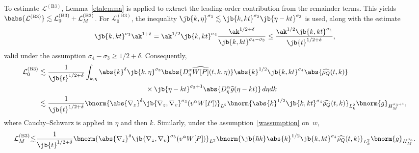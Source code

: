 To estimate $\mathcal{L}^{\mathrm{(B3)}}$, Lemma~\ref{etalemma} is applied to extract the leading-order contribution from the remainder terms. This yields $\babs{\mathcal{L}^{\mathrm{(B3)}}}\lesssim\mathcal{L}_0^{\mathrm{(B3)}} + \mathcal{L}_M^{\mathrm{(B3)}}$. For $\mathcal{L}_0^{\mathrm{(B3)}}$, the inequality $\jb{k,\eta}^{\sigma_3}\lesssim\jb{k,kt}^{\sigma_3}\jb{\eta-kt}^{\sigma_3}$ is used, along with the estimate
\begin{align*}
\jb{k,kt}^{\sigma_3}\ak^{1+\delta}=\ak^{1/2}\jb{k,kt}^{\sigma_4}\frac{\ak^{1/2+\delta}}{\jb{k,kt}^{\sigma_4-\sigma_3}}\leq \frac{\ak^{1/2}\jb{k,kt}^{\sigma_4}}{\jb{t}^{1/2+\delta}} ,
\end{align*}valid under the assumption $\sigma_4-\sigma_3\geq1/2+\delta$. Consequently,
\begin{align*}
\mathcal{L}_0^{\mathrm{(B3)}}&\lesssim\frac{1}{\jb{t}^{1/2+\delta}}\int_{k,\eta}\abs{k}^\delta\jb{k,\eta}^{\sigma_3} \babs{D_\eta^\alpha \widehat{W[P]}(t,k,\eta)}\abs{k}^{1/2}\jb{k,kt}^{\sigma_4} \abs{\widehat{\rho_Q}(t,k)}\\
&\hspace{5.5cm}\times\jb{\eta-kt}^{\sigma_3+1}\abs{D^\alpha_\eta\widehat g(\eta-kt)}\,d\eta dk\\
&\lesssim\frac{1}{\jb{t}^{1/2+\delta}}\bnorm{\abs{\nabla_z}^\delta\jb{\nabla_z,\nabla_v}^{\sigma_3}(v^\alpha W[P])}_{L^2}\bnorm{\abs{k}^{1/2}\jb{k,kt}^{\sigma_4} \widehat{\rho_Q}(t,k)}_{L^2_k}\bnorm{g}_{H^{\sigma_3+1}_M},
\end{align*}
where Cauchy–Schwarz is applied in $\eta$ and then $k$. Similarly, under the assumption~\eqref{wassumption} on~$w$,
\begin{align*}
\mathcal{L}_M^{\mathrm{(B3)}}\hspace{-0.08cm}\lesssim\hspace{-0.08cm}\frac{1}{\jb{t}^{1/2+\delta}}\bnorm{\abs{\nabla_z}^\delta\jb{\nabla_z,\nabla_v}^{\sigma_3}(v^\alpha W[P])}_{L^2}\bnorm{\jb{\hbar k}\abs{k}^{1/2}\jb{k,kt}^{\sigma_4} \widehat{\rho_Q}(t,k)}_{L^2_k}\bnorm{g}_{H^{\sigma_3}_M}.
\end{align*}

